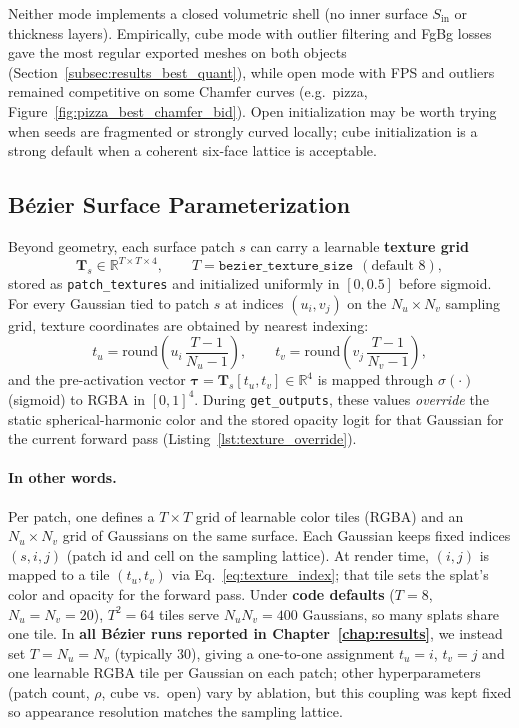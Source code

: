 Neither mode implements a closed volumetric shell (no inner surface $S_{\mathrm{in}}$ or thickness layers). Empirically, cube mode with outlier filtering and FgBg losses gave the most regular exported meshes on both objects (Section~\ref{subsec:results_best_quant}), while open mode with FPS and outliers remained competitive on some Chamfer curves (e.g.\ pizza, Figure~\ref{fig:pizza_best_chamfer_bid}). Open initialization may be worth trying when seeds are fragmented or strongly curved locally; cube initialization is a strong default when a coherent six-face lattice is acceptable.

\subsection{B\'ezier Surface Parameterization}
\label{subsec:bezier_textures}

Beyond geometry, each surface patch $s$ can carry a learnable \textbf{texture grid}
\[
\mathbf{T}_s \in \mathbb{R}^{T\times T\times 4},
\qquad T=\texttt{bezier\_texture\_size}\ \ (\text{default }8),
\]
stored as \texttt{patch\_textures} and initialized uniformly in $[0,0.5]$ before sigmoid. For every Gaussian tied to patch $s$ at indices $(u_i,v_j)$ on the $N_u\times N_v$ sampling grid, texture coordinates are obtained by nearest indexing:
\begin{equation}
t_u = \mathrm{round}\!\left(u_i\,\frac{T-1}{N_u-1}\right),\qquad
t_v = \mathrm{round}\!\left(v_j\,\frac{T-1}{N_v-1}\right),
\label{eq:texture_index}
\end{equation}
and the pre-activation vector $\boldsymbol{\tau}=\mathbf{T}_s[t_u,t_v]\in\mathbb{R}^4$ is mapped through $\sigma(\cdot)$ (sigmoid) to RGBA in $[0,1]^4$. During \texttt{get\_outputs}, these values \emph{override} the static spherical-harmonic color and the stored opacity logit for that Gaussian for the current forward pass (Listing~\ref{lst:texture_override}).

\paragraph{In other words.}
Per patch, one defines a $T\times T$ grid of learnable color tiles (RGBA) and an $N_u\times N_v$ grid of Gaussians on the same surface. Each Gaussian keeps fixed indices $(s,i,j)$ (patch id and cell on the sampling lattice). At render time, $(i,j)$ is mapped to a tile $(t_u,t_v)$ via Eq.~\eqref{eq:texture_index}; that tile sets the splat's color and opacity for the forward pass. Under \textbf{code defaults} ($T{=}8$, $N_u{=}N_v{=}20$), $T^2{=}64$ tiles serve $N_u N_v{=}400$ Gaussians, so many splats share one tile. In \textbf{all B\'ezier runs reported in Chapter~\ref{chap:results}}, we instead set $T=N_u=N_v$ (typically $30$), giving a one-to-one assignment $t_u{=}i$, $t_v{=}j$ and one learnable RGBA tile per Gaussian on each patch; other hyperparameters (patch count, $\rho$, cube vs.\ open) vary by ablation, but this coupling was kept fixed so appearance resolution matches the sampling lattice.


